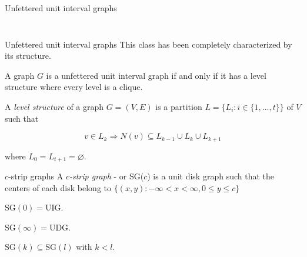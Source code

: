 \begin{frame}{Unfettered unit interval graphs}
\begin{columns}
\begin{column}{0.5\textwidth}
\begin{columns}
\begin{column}{0.5\textwidth}
\begin{figure}
\begin{tikzpicture}[scale=1.5]
\end{tikzpicture}
\label{fig:muigK13}
\end{figure}
\end{column}
\end{columns}

\end{column}
\end{columns}

\end{frame}

\begin{frame}{Unfettered unit interval graphs}
  This class has been completely characterized by its structure.

  \begin{theorem}
      A graph $G$ is a unfettered unit interval graph if and only if it has a level structure where every level is a clique.
  \end{theorem}
  \vfill
  \begin{definition}
    A \emph{level structure} of a graph $G = (V,E)$ is a partition $L = \{L_i : i \in \{1,\dots, t\}\}$ of $V$ such that

    $$v \in L_k \Rightarrow N(v) \subseteq L_{k-1} \cup L_{k} \cup L_{k+1}$$

    where $L_0 = L_{t+1} = \varnothing$.
  \end{definition}
\end{frame}

\begin{frame}{$c$-strip graphs}
  A \emph{$c$-strip graph} - or SG($c$) is a unit disk graph such that the centers of each disk belong to $\{(x,y) : -\infty < x < \infty, 0 \leq y \leq c\}$
  \vfill
  \pause
  \begin{remark}
    $\text{SG}(0) = \text{UIG}$.
  \end{remark}
  \begin{remark}
    $\text{SG}(\infty) = \text{UDG}$.
  \end{remark}
  \begin{remark}
    $\text{SG}(k) \subseteq \text{SG}(l)$ with $k < l$.
  \end{remark}

\end{frame}

